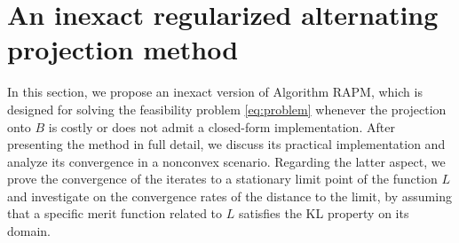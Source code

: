 \documentclass[pdflatex,sn-mathphys-num]{sn-jnl}
\numberwithin{equation}{section}%
\theoremstyle{thmstyleone}%
\theoremstyle{thmstyletwo}%
\theoremstyle{thmstylethree}%
\begin{document}
\section{An inexact regularized alternating projection method}

In this section, we propose an inexact version of Algorithm RAPM, which is designed for solving the feasibility problem \eqref{eq:problem} whenever the projection onto $B$ is costly or does not admit a closed-form implementation. After presenting the method in full detail, we discuss its practical implementation and analyze its convergence in a nonconvex scenario. Regarding the latter aspect, we prove the convergence of the iterates to a stationary limit point of the function $L$ and investigate on  the  convergence rates of the distance to the limit, by assuming that a specific merit function related to $L$ satisfies the KL property on its domain.
\end{document}
